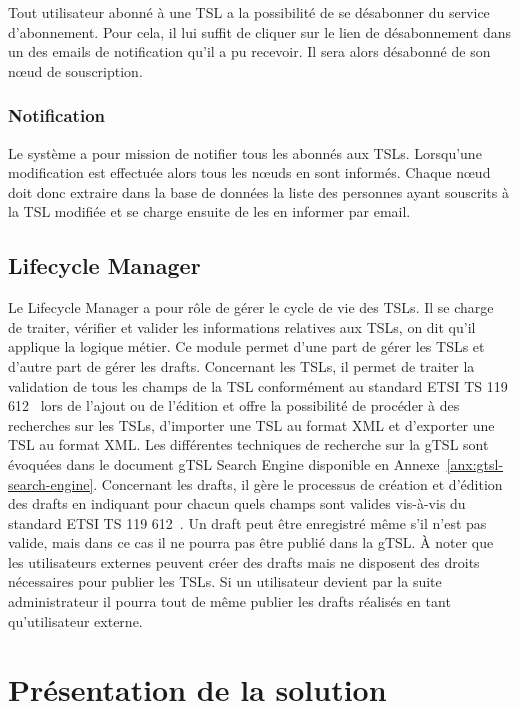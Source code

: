 \documentclass{tnreport}
\begin{document}
Tout utilisateur abonné à une TSL a la possibilité de se désabonner du service d'abonnement. Pour cela, il lui suffit de cliquer sur le lien de désabonnement dans un des emails de notification qu'il a pu recevoir. Il sera alors désabonné de son nœud de souscription.

\subsubsection{Notification}

Le système a pour mission de notifier tous les abonnés aux TSLs. Lorsqu'une modification est effectuée alors tous les nœuds en sont informés. Chaque nœud doit donc extraire dans la base de données la liste des personnes ayant souscrits à la TSL modifiée et se charge ensuite de les en informer par email.

\subsection{Lifecycle Manager}

Le Lifecycle Manager a pour rôle de gérer le cycle de vie des TSLs. Il se charge de traiter, vérifier et valider les informations relatives aux TSLs, on dit qu'il applique la logique métier. Ce module permet d'une part de gérer les TSLs et d'autre part de gérer les drafts. Concernant les TSLs, il permet de traiter la validation de tous les champs de la TSL conformément au standard ETSI TS 119 612~\cite{ETSITS119612} lors de l'ajout ou de l'édition et offre la possibilité de procéder à des recherches sur les TSLs, d'importer une TSL au format XML et d'exporter une TSL au format XML. Les différentes techniques de recherche sur la gTSL sont évoquées dans le document gTSL Search Engine disponible en Annexe~\ref{anx:gtsl-search-engine}. Concernant les drafts, il gère le processus de création et d'édition des drafts en indiquant pour chacun quels champs sont valides vis-à-vis du standard ETSI TS 119 612~\cite{ETSITS119612}. Un draft peut être enregistré même s'il n'est pas valide, mais dans ce cas il ne pourra pas être publié dans la gTSL. À noter que les utilisateurs externes peuvent créer des drafts mais ne disposent des droits nécessaires pour publier les TSLs. Si un utilisateur devient par la suite administrateur il pourra tout de même publier les drafts réalisés en tant qu'utilisateur externe.

\section{Présentation de la solution}
\end{document}
